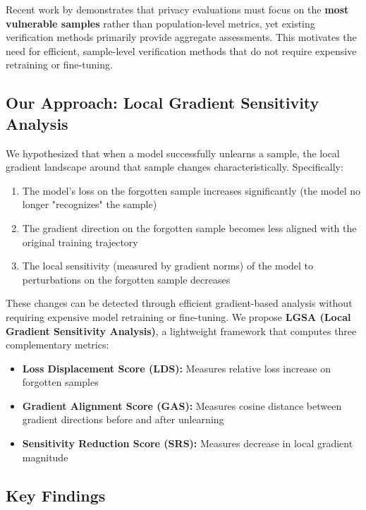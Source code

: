 \documentclass{article}
\begin{document}
Recent work by \cite{aerni2024evaluations} demonstrates that privacy evaluations must focus on the \textbf{most vulnerable samples} rather than population-level metrics, yet existing verification methods primarily provide aggregate assessments. This motivates the need for efficient, sample-level verification methods that do not require expensive retraining or fine-tuning.

\subsection{Our Approach: Local Gradient Sensitivity Analysis}

We hypothesized that when a model successfully unlearns a sample, the local gradient landscape around that sample changes characteristically. Specifically:
\begin{enumerate}
    \item The model's loss on the forgotten sample increases significantly (the model no longer "recognizes" the sample)
    \item The gradient direction on the forgotten sample becomes less aligned with the original training trajectory
    \item The local sensitivity (measured by gradient norms) of the model to perturbations on the forgotten sample decreases
\end{enumerate}

These changes can be detected through efficient gradient-based analysis without requiring expensive model retraining or fine-tuning. We propose \textbf{LGSA (Local Gradient Sensitivity Analysis)}, a lightweight framework that computes three complementary metrics:
\begin{itemize}
    \item \textbf{Loss Displacement Score (LDS):} Measures relative loss increase on forgotten samples
    \item \textbf{Gradient Alignment Score (GAS):} Measures cosine distance between gradient directions before and after unlearning
    \item \textbf{Sensitivity Reduction Score (SRS):} Measures decrease in local gradient magnitude
\end{itemize}

\subsection{Key Findings}
\end{document}
